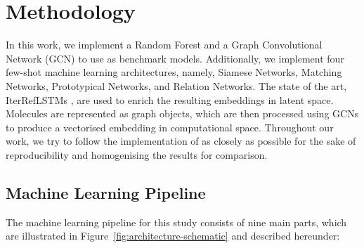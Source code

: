 \section{Methodology}


In this work, we implement a Random Forest and a Graph Convolutional Network (GCN) to use as benchmark models. Additionally, we implement four few-shot machine learning architectures, namely, Siamese Networks, Matching Networks, Prototypical Networks, and Relation Networks. The state of the art, IterRefLSTMs \citep{altae2017low}, are used to enrich the resulting embeddings in latent space. Molecules are represented as graph objects, which are then processed using GCNs to produce a vectorised embedding in computational space. Throughout our work, we try to follow the implementation of \citet{altae2017low} as closely as possible for the sake of reproducibility and homogenising the results for comparison.

\subsection{Machine Learning Pipeline}

The machine learning pipeline for this study consists of nine main parts, which are illustrated in Figure~\ref{fig:architecture-schematic} and described hereunder:

